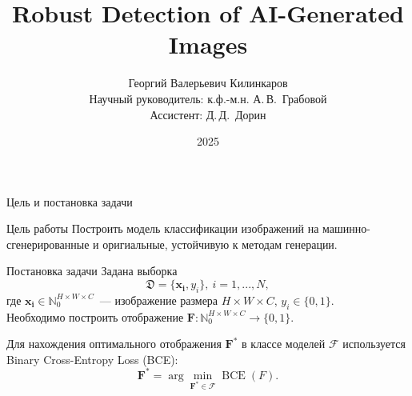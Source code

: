 \documentclass[aspectratio=169]{beamer}
\title[\hbox to 56mm{Краткое название}]{Robust Detection of AI-Generated Images}
\author[Г.\,В.~Килинкаров]{Георгий Валерьевич Килинкаров\\
\small Научный руководитель: к.ф.-м.н. А.\,В.~Грабовой \\
\small Ассистент: Д.\,Д.~Дорин}
\institute{Анализ данных ФПМИ МФТИ}
\date{2025}
\begin{document}
\begin{frame}
\thispagestyle{empty}
\maketitle
\end{frame}

\begin{frame}{Цель и постановка задачи}
\begin{block}{Цель работы}
    Построить модель классификации изображений на машинно-сгенерированные и оригиальные, устойчивую к методам генерации. 
\end{block}
\begin{block}{Постановка задачи}
Задана выборка $$\mathfrak{D} = \{\bm{x_i}, y_i \},\ i= 1, ..., N,$$ где $\bm{x_i} \in \mathbb{N}_0^{H \times W \times C}$~--- изображение размера $H \times W \times C$, $y_i \in \{ 0, 1\}.$ \\

Необходимо построить отображение $\bm{F}: \mathbb{N}_0^{H \times W \times C} \rightarrow \{ 0, 1 \}.$

Для нахождения оптимального отображения \( \bm{F}^* \) в классе моделей \( \mathcal{F} \) используется Binary Cross-Entropy Loss (BCE):
\[
	\bm{F}^* = \arg\min_{\bm{F}^* \in \mathcal{F}} \operatorname{BCE}(F).
\]
\end{block}
\end{frame}
\end{document}
